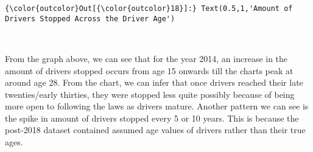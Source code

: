 \documentclass[11pt]{article}
\begin{document}
\begin{Verbatim}[commandchars=\\\{\}]
{\color{outcolor}Out[{\color{outcolor}18}]:} Text(0.5,1,'Amount of Drivers Stopped Across the Driver Age')
\end{Verbatim}
            
    \begin{center}
    \end{center}
    { \hspace*{\fill} \\}
    
    From the graph above, we can see that for the year 2014, an increase in
the amount of drivers stopped occurs from age 15 onwards till the charts
peak at around age 28. From the chart, we can infer that once drivers
reached their late twenties/early thirties, they were stopped less quite
possibly because of being more open to following the laws as drivers
mature. Another pattern we can see is the spike in amount of drivers
stopped every 5 or 10 years. This is because the post-2018 dataset
contained assumed age values of drivers rather than their true ages.
\end{document}
